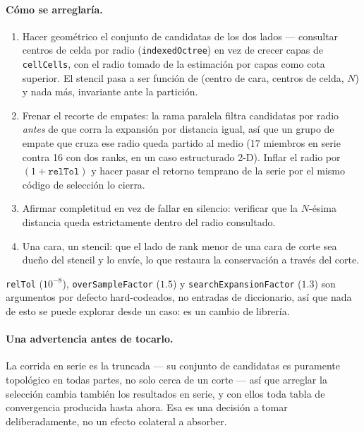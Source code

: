 \documentclass[11pt,a4paper]{article}
\newcommand{\code}[1]{\texttt{\small #1}}
\begin{document}
\paragraph{Cómo se arreglaría.}
\begin{enumerate}
  \item Hacer geométrico el conjunto de candidatas de los dos lados --- consultar
        centros de celda por radio (\code{indexedOctree}) en vez de crecer capas
        de \code{cellCells}, con el radio tomado de la estimación por capas como
        cota superior. El stencil pasa a ser función de (centro de cara, centros
        de celda, $N$) y nada más, invariante ante la partición.
  \item Frenar el recorte de empates: la rama paralela filtra candidatas por
        radio \emph{antes} de que corra la expansión por distancia igual, así que
        un grupo de empate que cruza ese radio queda partido al medio (17
        miembros en serie contra 16 con dos ranks, en un caso estructurado 2-D).
        Inflar el radio por $(1+\texttt{relTol})$ y hacer pasar el retorno
        temprano de la serie por el mismo código de selección lo cierra.
  \item Afirmar completitud en vez de fallar en silencio: verificar que la
        $N$-ésima distancia queda estrictamente dentro del radio consultado.
  \item Una cara, un stencil: que el lado de rank menor de una cara de corte sea
        dueño del stencil y lo envíe, lo que restaura la conservación a través
        del corte.
\end{enumerate}

\code{relTol} ($10^{-8}$), \code{overSampleFactor} ($1.5$) y
\code{searchExpansionFactor} ($1.3$) son argumentos por defecto hard-codeados, no
entradas de diccionario, así que nada de esto se puede explorar desde un caso: es
un cambio de librería.

\paragraph{Una advertencia antes de tocarlo.} La corrida en serie es la truncada
--- su conjunto de candidatas es puramente topológico en todas partes, no solo
cerca de un corte --- así que arreglar la selección cambia también los resultados
en serie, y con ellos toda tabla de convergencia producida hasta ahora. Esa es
una decisión a tomar deliberadamente, no un efecto colateral a absorber.

\end{document}
